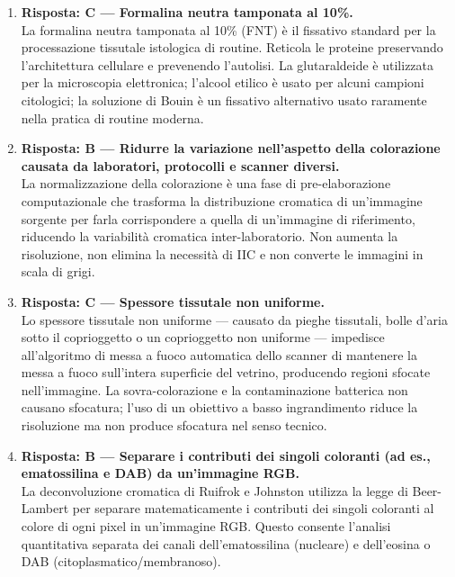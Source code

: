 \begin{enumerate}

    \item \textbf{Risposta: C --- Formalina neutra tamponata al 10\%.}\\
    La formalina neutra tamponata al 10\% (FNT) è il fissativo standard per la processazione
    tissutale istologica di routine. Reticola le proteine preservando l'architettura cellulare e
    prevenendo l'autolisi. La glutaraldeide è utilizzata per la microscopia elettronica; l'alcool
    etilico è usato per alcuni campioni citologici; la soluzione di Bouin è un fissativo
    alternativo usato raramente nella pratica di routine moderna.

    \item \textbf{Risposta: B --- Ridurre la variazione nell'aspetto della colorazione causata da
    laboratori, protocolli e scanner diversi.}\\
    La normalizzazione della colorazione è una fase di pre-elaborazione computazionale che
    trasforma la distribuzione cromatica di un'immagine sorgente per farla corrispondere a quella
    di un'immagine di riferimento, riducendo la variabilità cromatica inter-laboratorio. Non
    aumenta la risoluzione, non elimina la necessità di IIC e non converte le immagini in scala
    di grigi.

    \item \textbf{Risposta: C --- Spessore tissutale non uniforme.}\\
    Lo spessore tissutale non uniforme --- causato da pieghe tissutali, bolle d'aria sotto il
    coprioggetto o un coprioggetto non uniforme --- impedisce all'algoritmo di messa a fuoco
    automatica dello scanner di mantenere la messa a fuoco sull'intera superficie del vetrino,
    producendo regioni sfocate nell'immagine. La sovra-colorazione e la contaminazione batterica
    non causano sfocatura; l'uso di un obiettivo a basso ingrandimento riduce la risoluzione ma
    non produce sfocatura nel senso tecnico.

    \item \textbf{Risposta: B --- Separare i contributi dei singoli coloranti (ad es., ematossilina
    e DAB) da un'immagine RGB.}\\
    La deconvoluzione cromatica di Ruifrok e Johnston utilizza la legge di Beer-Lambert per
    separare matematicamente i contributi dei singoli coloranti al colore di ogni pixel in
    un'immagine RGB. Questo consente l'analisi quantitativa separata dei canali dell'ematossilina
    (nucleare) e dell'eosina o DAB (citoplasmatico/membranoso).


\end{enumerate}
